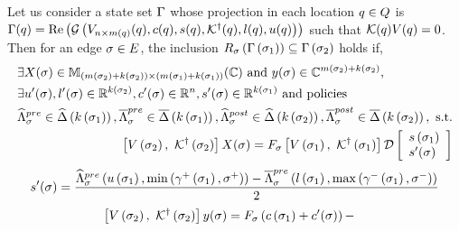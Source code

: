 \begin{lemma}
  Let us consider a state set $\Gamma$ whose projection in each
  location $q\in Q$ is $\Gamma(q) =
  \operatorname{\operatorname{Re}}\left(\mathcal{G}\left(V_{n\times
      m(q)}(q),c(q),s(q),\mathcal{K}^\dagger(q),l(q),u(q)\right)\right)$
  such that $\mathcal{K}(q)V(q) = 0$.  Then for an edge
  $\sigma\in E$, the inclusion
  $R_{\sigma}\left(\Gamma\left(\sigma_{1}\right)\right)
  \subseteq \Gamma\left(\sigma_{2}\right)$ holds if,
\begin{align}
\begin{split}
& \exists X(\sigma)\in
\mathbb{M}_{\left(m\left(\sigma_{2}\right)+k\left(\sigma_{2}\right)\right)\times \left(m\left(\sigma_{1}\right)+k\left(\sigma_{1}\right)\right)}(\mathbb{\mathbb{C}})~\text{and}~y(\sigma)\in
\mathbb{C}^{m\left(\sigma_{2}\right)+k\left(\sigma_{2}\right)},\\
& \exists u^\prime(\sigma),l^\prime(\sigma)\in \mathbb{R}^{k\left(\sigma_{2}\right)}, c^\prime(\sigma)\in\mathbb{R}^n,s^\prime(\sigma)\in\mathbb{R}^{k\left(\sigma_{1}\right)}~\text{and policies}\\
&\widehat{\Lambda}_{\sigma}^{pre}\in\widehat{\Delta}\left(k\left(\sigma_{1}\right)\right),\overline{\Lambda}_{\sigma}^{pre}\in\overline{\Delta}\left(k\left(\sigma_{1}\right)\right),
\widehat{\Lambda}_{\sigma}^{post}\in\widehat{\Delta}\left(k\left(\sigma_{2}\right)\right),\overline{\Lambda}_{\sigma}^{post}\in\overline{\Delta}\left(k\left(\sigma_{2}\right)\right),~\text{s.t.}
\end{split}\\
\begin{split}
& \left[V\left(\sigma_{2}\right),~\mathcal{K}^\dagger\left(\sigma_{2}\right)\right]X(\sigma) = F_{\sigma}\left[V\left(\sigma_{1}\right),~\mathcal{K}^\dagger\left(\sigma_{1}\right)\right]\mathcal{D}
\left[\begin{array}{l}{s\left(\sigma_{1}\right)}\\{s^\prime(\sigma)} \end{array}\right]\\
\end{split}
\end{align}
\begin{align}
\begin{split}
s^\prime(\sigma) = \frac{\widehat{\Lambda}_{\sigma}^{pre}\left(u\left(\sigma_{1}\right),\min\left(\gamma^+\left(\sigma_{1}\right),\sigma^+\right)\right)-
\overline{\Lambda}_{\sigma}^{pre}\left(l\left(\sigma_{1}\right),\max\left(\gamma^-\left(\sigma_{1}\right),\sigma^-\right)\right)}{2}\\
\end{split}
\end{align}
\begin{align}
\begin{split}
& \lt[V\lt(\postloc{\edge}\rt),~\pinv{\ptemplate}\lt(\postloc{\edge}\rt)\rt]y(\edge) = \reset{\edge}\lt(c\lt(\preloc{\edge}\rt)+c^\pr(\edge)\rt)- 

\end{split}
\end{align}
\end{lemma}
